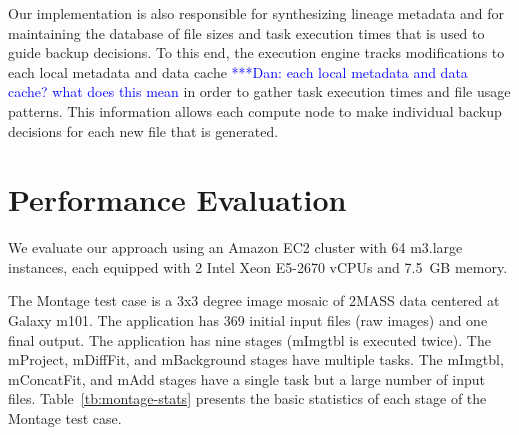 \documentclass{sig-alternate}
\newcommand{\katznote}[1]{ {\textcolor{blue}    { ***Dan:      #1 }}}
\newcommand{\katznote}[1]{}
\begin{document}
Our implementation is also responsible for synthesizing lineage metadata and for
maintaining the database of file sizes and task execution times that is
used to guide backup decisions. To this end, the execution engine tracks modifications to each
local metadata and data cache \katznote{each local metadata and data cache? what does this mean} in order to gather task execution times and file usage patterns.
This information allows each compute node to make individual backup decisions for each new
file that is generated.



\section{Performance Evaluation}
\label{sec:Perf}
We evaluate our approach using an Amazon EC2 cluster with 64 m3.large instances, each
equipped with 2 Intel Xeon E5-2670 vCPUs and 7.5~GB memory. 

The Montage test case is a 3x3 degree image mosaic of 2MASS data centered at Galaxy m101. 
The application has 369 initial input files (raw images) and one final output. 
The application has nine stages (mImgtbl is executed twice). 
The mProject, mDiffFit, and mBackground stages have multiple tasks. 
The mImgtbl, mConcatFit, and mAdd stages have a single task but a large number of input files. 
Table~\ref{tb:montage-stats} presents the basic statistics of each stage of the Montage test case.
\end{document}
